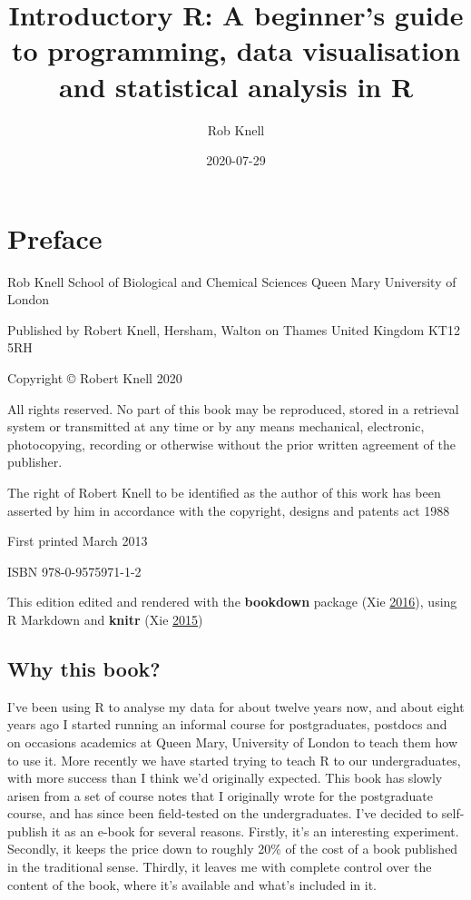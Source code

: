 \documentclass[
]{book}
\title{Introductory R: A beginner's guide to programming, data visualisation and statistical analysis in R}
\author{Rob Knell}
\date{2020-07-29}
\begin{document}
\maketitle

{
\setcounter{tocdepth}{1}
\tableofcontents
}
\hypertarget{preface}{%
\chapter{Preface}\label{preface}}

Rob Knell
School of Biological and Chemical Sciences
Queen Mary University of London

Published by Robert Knell,
Hersham,
Walton on Thames
United Kingdom KT12 5RH

Copyright © Robert Knell 2020

All rights reserved. No part of this book may be reproduced, stored in a retrieval system or transmitted at any time or by any means mechanical, electronic, photocopying, recording or otherwise without the prior written agreement of the publisher.

The right of Robert Knell to be identified as the author of this work has been asserted by him in accordance with the copyright, designs and patents act 1988

First printed March 2013

ISBN 978-0-9575971-1-2

This edition edited and rendered with the \textbf{bookdown} package (Xie \protect\hyperlink{ref-xie2016}{2016}), using R Markdown and \textbf{knitr} (Xie \protect\hyperlink{ref-xie2015}{2015})

\hypertarget{why-this-book}{%
\section{Why this book?}\label{why-this-book}}

I've been using R to analyse my data for about twelve years now, and about eight years ago I started running an informal course for postgraduates, postdocs and on occasions academics at Queen Mary, University of London to teach them how to use it. More recently we have started trying to teach R to our undergraduates, with more success than I think we'd originally expected. This book has slowly arisen from a set of course notes that I originally wrote for the postgraduate course, and has since been field-tested on the undergraduates. I've decided to self-publish it as an e-book for several reasons. Firstly, it's an interesting experiment. Secondly, it keeps the price down to roughly 20\% of the cost of a book published in the traditional sense. Thirdly, it leaves me with complete control over the content of the book, where it's available and what's included in it.
\end{document}
